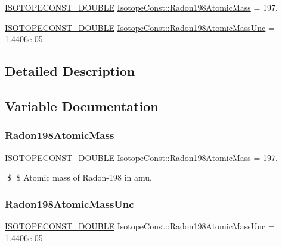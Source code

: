 \begin{DoxyCompactItemize}
\item 
\mbox{\hyperlink{group___isotope_const-_macros_ga8f45a7272ce02c0b4c65c44636ed719a}{I\+S\+O\+T\+O\+P\+E\+C\+O\+N\+S\+T\+\_\+\+D\+O\+U\+B\+LE}} \mbox{\hyperlink{group___isotope_const-_radon-_rn198_ga5aab25c6a13925c2482be8cf1a0ac6f6}{Isotope\+Const\+::\+Radon198\+Atomic\+Mass}} = 197.
\item 
\mbox{\hyperlink{group___isotope_const-_macros_ga8f45a7272ce02c0b4c65c44636ed719a}{I\+S\+O\+T\+O\+P\+E\+C\+O\+N\+S\+T\+\_\+\+D\+O\+U\+B\+LE}} \mbox{\hyperlink{group___isotope_const-_radon-_rn198_ga6d7048a9a191984e9453d652419711b0}{Isotope\+Const\+::\+Radon198\+Atomic\+Mass\+Unc}} = 1.\+4406e-\/05
\end{DoxyCompactItemize}


\subsection{Detailed Description}


\subsection{Variable Documentation}
\mbox{\label{group___isotope_const-_radon-_rn198_ga5aab25c6a13925c2482be8cf1a0ac6f6}} 
\subsubsection{\texorpdfstring{Radon198\+Atomic\+Mass}{Radon198AtomicMass}}
{\footnotesize\ttfamily \mbox{\hyperlink{group___isotope_const-_macros_ga8f45a7272ce02c0b4c65c44636ed719a}{I\+S\+O\+T\+O\+P\+E\+C\+O\+N\+S\+T\+\_\+\+D\+O\+U\+B\+LE}} Isotope\+Const\+::\+Radon198\+Atomic\+Mass = 197.}

\$ \$ Atomic mass of Radon-\/198 in amu. \mbox{\label{group___isotope_const-_radon-_rn198_ga6d7048a9a191984e9453d652419711b0}} 
\subsubsection{\texorpdfstring{Radon198\+Atomic\+Mass\+Unc}{Radon198AtomicMassUnc}}
{\footnotesize\ttfamily \mbox{\hyperlink{group___isotope_const-_macros_ga8f45a7272ce02c0b4c65c44636ed719a}{I\+S\+O\+T\+O\+P\+E\+C\+O\+N\+S\+T\+\_\+\+D\+O\+U\+B\+LE}} Isotope\+Const\+::\+Radon198\+Atomic\+Mass\+Unc = 1.\+4406e-\/05}

